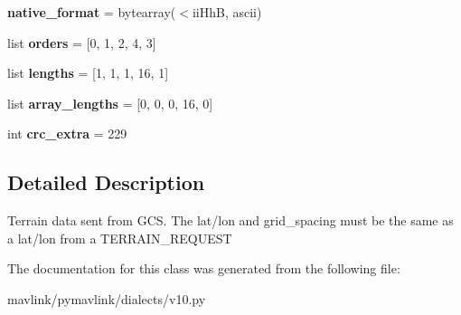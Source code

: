\begin{DoxyCompactItemize}
{\bfseries native\+\_\+format} = bytearray(\textquotesingle{}$<$ii\+HhB\textquotesingle{}, \textquotesingle{}ascii\textquotesingle{})
\item 
\mbox{\label{classpymavlink_1_1dialects_1_1v10_1_1MAVLink__terrain__data__message_ab3f5073df4a6236359d2e6207979f1ba}} 
list {\bfseries orders} = \mbox{[}0, 1, 2, 4, 3\mbox{]}
\item 
\mbox{\label{classpymavlink_1_1dialects_1_1v10_1_1MAVLink__terrain__data__message_a6ed5019c4886560a6b6aaeb78a6858b2}} 
list {\bfseries lengths} = \mbox{[}1, 1, 1, 16, 1\mbox{]}
\item 
\mbox{\label{classpymavlink_1_1dialects_1_1v10_1_1MAVLink__terrain__data__message_a949a3adac3a5928776b8b0a1e278b809}} 
list {\bfseries array\+\_\+lengths} = \mbox{[}0, 0, 0, 16, 0\mbox{]}
\item 
\mbox{\label{classpymavlink_1_1dialects_1_1v10_1_1MAVLink__terrain__data__message_a4fc23a535adc64f2ae052746d8e9fa0a}} 
int {\bfseries crc\+\_\+extra} = 229
\end{DoxyCompactItemize}


\subsection{Detailed Description}
\begin{DoxyVerb}Terrain data sent from GCS. The lat/lon and grid_spacing must
be the same as a lat/lon from a TERRAIN_REQUEST
\end{DoxyVerb}
 

The documentation for this class was generated from the following file\+:\begin{DoxyCompactItemize}
\item 
mavlink/pymavlink/dialects/v10.\+py\end{DoxyCompactItemize}
